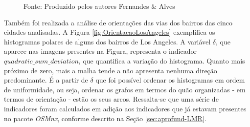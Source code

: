 \begin{figure}[H]
\begin{subfigure}{0.49\textwidth}
    \end{subfigure}
    \caption*{Fonte: Produzido pelos autores Fernandes \& Alves}
\end{figure}

Também foi realizada a análise de orientações das vias dos bairros das cinco cidades analisadas.
A Figura \ref{fig:OrientacaoLosAngeles} exemplifica os histogramas polares de alguns dos bairros de Los Angeles.
A variável $\delta$, que aparece nas imagens presentes na Figura, representa o indicador $quadratic\_sum\_deviation$, que quantifica a variação do histograma. 
Quanto mais próximo de zero, mais a malha tende a não apresenta nenhuma direção predominante.
É a partir de $\delta$ que foi possível ordenar os histogramas em ordem de uniformidade, ou seja, ordenar os grafos em termos do quão organizadas - em termos de orientação - estão os seus arcos. 
Ressalta-se que uma série de indicadores foram calculados em adição aos indicadores que já estavam presentes no pacote \textit{OSMnx}, conforme descrito na Seção \ref{sec:aprofund-LMR}.

